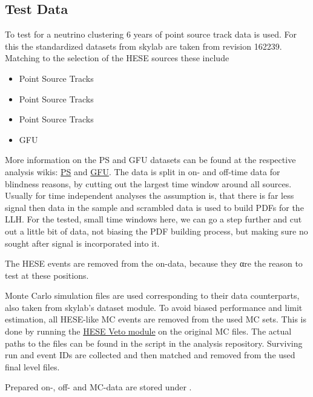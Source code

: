 \subsection{Test Data}
To test for a neutrino clustering 6 years of point source track data is used.
For this the standardized datasets from skylab are taken from revision 162239.
Matching to the selection of the HESE sources these include
\begin{itemize}
  \item Point Source Tracks 
  \item Point Source Tracks 
  \item Point Source Tracks 
  \item GFU 
\end{itemize}
More information on the PS and GFU datasets can be found at the respective analysis wikis: \href{https://icecube.wisc.edu/~coenders/html/build/html/ic86-bdt/muonL3.html}{PS} and \href{https://icecube.wisc.edu/~tkintscher/internal/gfu_doc/eventselection.html}{GFU}.
The data is split in on- and off-time data for blindness reasons, by cutting out the largest time window around all sources.
Usually for time independent analyses the assumption is, that there is far less signal then data in the sample and scrambled data is used to build PDFs for the LLH.
For the tested, small time windows here, we can go a step further and cut out a little bit of data, not biasing the PDF building process, but making sure no sought after signal is incorporated into it.

The HESE events are removed from the on-data, because they αre the reason to test at these positions.

Monte Carlo simulation files are used corresponding to their data counterparts, also taken from skylab's dataset module.
To avoid biased performance and limit estimation, all HESE-like MC events are removed from the used MC sets.
This is done by running the \href{http://software.icecube.wisc.edu/documentation/projects/VHESelfVeto/index.html}{HESE Veto module} on the original MC  files.
The actual paths to the files can be found in the script  in the analysis repository.
Surviving run and event IDs are collected and then matched and removed from the used final level files.

Prepared on-, off- and MC-data are stored under .

